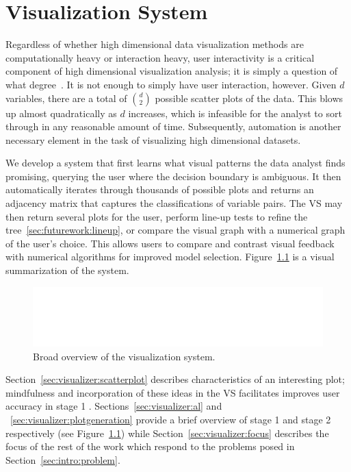 \chapter{Visualization System \label{ch:visualizer}}

Regardless of whether high dimensional data visualization methods are
computationally heavy or interaction heavy, user interactivity is a critical
component of high dimensional visualization analysis; it is simply a
question of what degree~\cite{lius2016}. It is not enough to simply have user 
interaction, however. Given $d$ variables, there are a total of $d\choose 2$ 
possible scatter plots of the data. This blows up almost quadratically as $d$ 
increases, which is infeasible for the analyst to sort through in any 
reasonable amount of time. Subsequently, automation is another necessary 
element in the task of visualizing high dimensional datasets.

We develop a system that first learns what visual patterns the data analyst 
finds promising, querying the user where the decision boundary is ambiguous. It 
then automatically iterates through thousands
of possible plots and returns an adjacency matrix that captures the 
classifications of variable pairs. The VS may then return several plots for the 
user, perform line-up tests to refine the tree~\ref{sec:futurework:lineup}, or 
compare the visual graph with a numerical graph of the user's choice. This 
allows users to compare and contrast visual feedback with numerical
algorithms for improved model selection. Figure~\ref{fig:visualizer:vs} 
is a visual summarization of the system.
       
\begin{figure}[htb]
	\begin{center}
		\includegraphics[width=1\linewidth]{ch-visualizer/figures/vs}
		\caption[Broad overview of the visualization system.]{Broad overview of 
		the visualization system.}
		\label{fig:visualizer:vs}
	\end{center}
\end{figure}

Section~\ref{sec:visualizer:scatterplot} describes characteristics of an 
interesting plot; mindfulness and incorporation of these ideas in the VS 
facilitates improves user accuracy in stage 1 . 
Sections~\ref{sec:visualizer:al} and ~\ref{sec:visualizer:plotgeneration} 
provide a brief overview of stage 1 and stage 2 respectively (see 
Figure~\ref{fig:visualizer:vs}) while 
Section~\ref{sec:visualizer:focus} describes the focus of the rest of the work 
which respond to the problems posed in Section~\ref{sec:intro:problem}.





